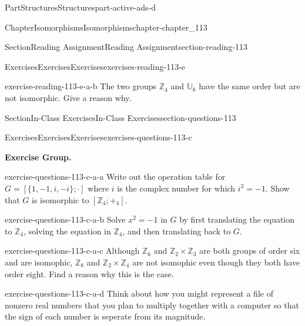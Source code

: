 \documentclass[oneside,10pt,]{book}
\numberwithin{equation}{section}
\begin{document}
\begin{partptx}{Part}{Structures}{}{Structures}{}{}{part-active-ads-d}
\begin{chapterptx}{Chapter}{Isomorphisms}{}{Isomorphisms}{}{}{chapter-chapter_113}
\begin{sectionptx}{Section}{Reading Assignment}{}{Reading Assignment}{}{}{section-reading-113}
\begin{exercises-subsection-numberless}{Exercises}{Exercises}{}{Exercises}{}{}{exercises-reading-113-e}
\begin{exercisegroup}
\begin{divisionexerciseeg}{2}{}{}{exercise-reading-113-e-a-b}
The two groups \(\mathbb{Z}_4\) and \(\mathbb{U}_8\) have the same order but are not isomorphic.  Give a reason why.%
\end{divisionexerciseeg}%
\end{exercisegroup}
\par\medskip\noindent
\end{exercises-subsection-numberless}
\end{sectionptx}
%
%
\typeout{************************************************}
\typeout{************************************************}
%
\begin{sectionptx}{Section}{In-Class Exercises}{}{In-Class Exercises}{}{}{section-questions-113}
%
%
%
\typeout{************************************************}
\typeout{************************************************}
%
\begin{exercises-subsection-numberless}{Exercises}{Exercises}{}{Exercises}{}{}{exercises-questions-113-c}
\par\medskip\noindent%
\textbf{Exercise Group.}\space\space%
\begin{exercisegroup}
\begin{divisionexerciseeg}{1}{}{}{exercise-questions-113-c-a-a}%
Write out the operation table for \(G = [\{1, -1, i, -i \}; \cdot ]\) where \(i\) is the complex number for which \(i^2 = - 1\). Show that \(G\) is isomorphic to \(\left[\mathbb{Z}_4;+_4\right]\).%
\end{divisionexerciseeg}%
\begin{divisionexerciseeg}{2}{}{}{exercise-questions-113-c-a-b}%
Solve \(x^2= -1\) in \(G\) by first translating the equation to \(\mathbb{Z}_4\), solving the equation in \(\mathbb{Z}_4\), and then translating back to \(G\).%
\end{divisionexerciseeg}%
\begin{divisionexerciseeg}{3}{}{}{exercise-questions-113-c-a-c}%
Although \(\mathbb{Z}_6\) and \(\mathbb{Z}_2 \times \mathbb{Z}_3\) are both groups of order six and are isomophic, \(\mathbb{Z}_8\) and \(\mathbb{Z}_2 \times \mathbb{Z}_4\) are not isomophic even though they both have order eight.  Find a reason why this is the case.%
\end{divisionexerciseeg}%
\begin{divisionexerciseeg}{4}{}{}{exercise-questions-113-c-a-d}%
Think about how you might represent a file of nonzero real numbers that you plan to multiply together with a computer so that the sign of each number is seperate from its magnitude.%

\end{divisionexerciseeg}
\end{exercisegroup}
\end{exercises-subsection-numberless}
\end{sectionptx}
\end{chapterptx}
\end{partptx}
\end{document}
